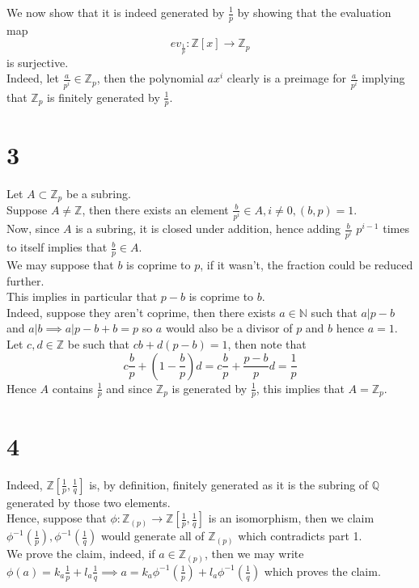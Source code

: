 \documentclass[11pt, a4paper]{article}
\begin{document}
We now show that it is indeed generated by $ \frac{1}{p}$ by showing that the evaluation map
\[ 
	ev_{\frac{1}{p}} : \mathbb{Z}[x ] \to \mathbb{Z}_p
\]
is surjective.\\
Indeed, let $ \frac{a}{p^{i}}\in \mathbb{Z}_{p}$, then the polynomial $ a x^{i}$ clearly is a preimage for $ \frac{a}{p^{i}}$ implying that $ \mathbb{Z}_p$ is finitely generated by $ \frac{1}{p}$.
\section*{3}
Let $ A \subset \mathbb{Z}_p$ be a subring.\\
Suppose $ A \neq \mathbb{Z}$, then there exists an element $ \frac{b}{p^{i}}\in A, i \neq 0, ( b,p) =1$.\\
Now, since $A$ is a subring, it is closed under addition, hence adding $ \frac{b}{p^{i}}$ $ p^{i-1}$ times to itself implies that $ \frac{b}{p}\in A$.\\
We may suppose that $b$ is coprime to $p$, if it wasn't, the fraction could be reduced further.\\
This implies in particular that $ p-b$ is coprime to $b$.\\
Indeed, suppose they aren't coprime, then there exists $a\in \mathbb{N}$ such that $a| p-b$ and $a|b\implies a|p-b+b = p$ so $a$ would also be a divisor of $p$ and $b$ hence $a=1$.\\
Let $c,d\in \mathbb{Z}$ be such that $ cb + d ( p-b) = 1$, then note that
\[ 
c \frac{b}{p} + ( 1- \frac{b}{p}) d = c \frac{b}{p} + \frac{p-b}{p}d = \frac{1}{p}
\]
Hence $ A$ contains $ \frac{1}{p}$ and since $ \mathbb{Z}_p$ is generated by $ \frac{1}{p}$, this implies that $ A = \mathbb{Z}_p$.
\section*{4}
Indeed, $ \mathbb{Z}\left[\frac{1}{p}, \frac{1}{q}\right]$ is, by definition, finitely generated as it is the subring of $ \mathbb{Q}$ generated by those two elements.\\
Hence, suppose that $ \phi:\mathbb{Z}_{ ( p) }\to \mathbb{Z} \left[ \frac{1}{p}, \frac{1}{q}\right] $ is an isomorphism, then we claim $ \phi^{-1}( \frac{1}{p}), \phi^{-1}( \frac{1}{q})  $ would generate all of $ \mathbb{Z}_{ ( p) } $ which contradicts part 1.\\
We prove the claim, indeed, if $ a \in \mathbb{Z}_{( p) } $, then we may write $ \phi( a) = k_a \frac{1}{p} + l_a \frac{1}{q}\implies a = k_a \phi^{-1}( \frac{1}{p}) + l_a \phi^{-1}( \frac{1}{q}) $ which proves the claim.
\end{document}

